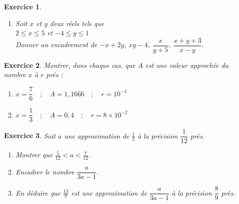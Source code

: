 \documentclass[12pt,a4paper]{article}
\theoremstyle{mystyle}
\newtheorem{exo}{Exercice}
\begin{document}
\begin{multicols*}{2}
\begin{exo}
\begin{enumerate}
    Donner l'encadrement de $a + b$, $a - b$, $a \times b$, et $\dfrac{a}{b}$.
    \item Soit $x$ et $y$ deux réels tels que\\
     $2 \leq x \leq 5$ et $-4 \leq y \leq 1$ \\
    Donner un encadrement de $-x + 2y$, $xy - 4$, $\dfrac{x}{y+5}$, $\dfrac{x + y + 3}{x - y}$.
\end{enumerate}
\end{exo}

\begin{exo}
Montrer, dans chaque cas, que $A$ est une valeur approchée du nombre $x$ à $r$ prés :
\begin{enumerate}
	\item $x = \dfrac{7}{6} \quad;\quad A = 1,1666 \quad;\quad r = 10^{-4}$
	\item $x = \dfrac{1}{3} \quad;\quad A = 0,4 \quad;\quad r = 8\times 10^{-2}$
\end{enumerate}
\end{exo}

\begin{exo}
Soit $a$ une approximation de $\frac{1}{2}$ à la précision $\dfrac{1}{12}$ près.
\begin{enumerate}
    \item Montrer que $\frac{5}{12} < a < \frac{7}{12}$.
    \item Encadrer le nombre $\dfrac{a}{3a - 1}$.
    \item En déduire que $\frac{13}{9}$ est une approximation de $\dfrac{a}{3a - 1}$ à la précision $\dfrac{8}{9}$ près.
\end{enumerate}
\end{exo}



















\end{multicols*}
\end{document}
